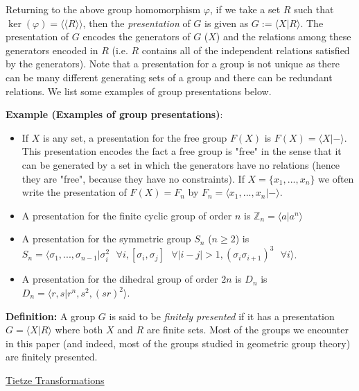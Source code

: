 \documentclass[12pt]{article}
\newcommand{\vs}{\vskip10pt}
\begin{document}
	\vs
	
	Returning to the above group homomorphism $\varphi$, if we take a set $R$ such that $\ker(\varphi) = \langle \langle R \rangle \rangle$, then the \textit{presentation} of $G$ is given as $G := \langle X \vert R \rangle$. The presentation of $G$ encodes the generators of $G$ ($X$) and the relations among these generators encoded in $R$ (i.e. $R$ contains all of the independent relations satisfied by the generators). Note that a presentation for a group is not unique as there can be many different generating sets of a group and there can be redundant relations. We list some examples of group presentations below. 
	
	\vs 
	
	\textbf{Example (Examples of group presentations)}: 
	
	\begin{itemize}
		\item If $X$ is any set, a presentation for the free group $F(X)$ is $F(X) = \langle X \vert - \rangle$. This presentation encodes the fact a free group is "free" in the sense that it can be generated by a set in which the generators have no relations (hence they are "free", because they have no constraints). If $X = \{x_1,...,x_n\} $ we often write the presentation of $F(X) = F_n$ by $F_n = \langle x_1,...,x_n \vert - \rangle$. 
		\item A presentation for the finite cyclic group of order $n$ is $\mathbb{Z}_n = \langle a \vert a^n \rangle$
		\item A presentation for the symmetric group $S_n$ ($n \geq 2$) is $S_n = \langle \sigma_1,...,\sigma_{n-1} \vert \sigma_i^2 \text{ } \forall i, [\sigma_i, \sigma_j] \text{ } \forall \vert i - j \vert > 1, (\sigma_i \sigma_{i+1})^3 \text{ } \forall i \rangle$. 
		\item A presentation for the dihedral group of order $2n$ is $D_n$ is $D_n = \langle r,s \vert r^n, s^2, (sr)^2 \rangle$. 
	\end{itemize}

	\textbf{Definition: } A group $G$ is said to be \textit{finitely presented} if it has a presentation $G = \langle X \vert R \rangle$ where both $X$ and $R$ are finite sets. Most of the groups we encounter in this paper (and indeed, most of the groups studied in geometric group theory) are finitely presented. 
	
	\vs 
	
	\underline{Tietze Transformations}
	
	\vs
	
\end{document}
